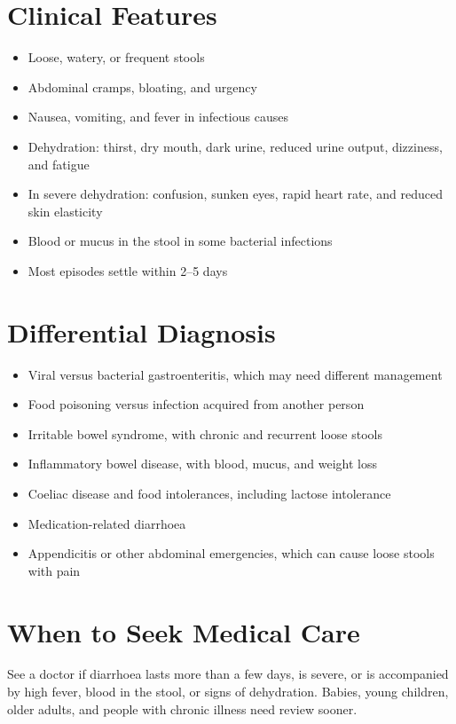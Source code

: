\section*{Clinical Features}
\begin{itemize}
    \item Loose, watery, or frequent stools
    \item Abdominal cramps, bloating, and urgency
    \item Nausea, vomiting, and fever in infectious causes
    \item Dehydration: thirst, dry mouth, dark urine, reduced urine output, dizziness, and fatigue
    \item In severe dehydration: confusion, sunken eyes, rapid heart rate, and reduced skin elasticity
    \item Blood or mucus in the stool in some bacterial infections
    \item Most episodes settle within 2--5 days
\end{itemize}

\section*{Differential Diagnosis}
\begin{itemize}
    \item Viral versus bacterial gastroenteritis, which may need different management
    \item Food poisoning versus infection acquired from another person
    \item Irritable bowel syndrome, with chronic and recurrent loose stools
    \item Inflammatory bowel disease, with blood, mucus, and weight loss
    \item Coeliac disease and food intolerances, including lactose intolerance
    \item Medication-related diarrhoea
    \item Appendicitis or other abdominal emergencies, which can cause loose stools with pain
\end{itemize}

\section*{When to Seek Medical Care}
See a doctor if diarrhoea lasts more than a few days, is severe, or is accompanied by high fever, blood in the stool, or signs of dehydration. Babies, young children, older adults, and people with chronic illness need review sooner.

